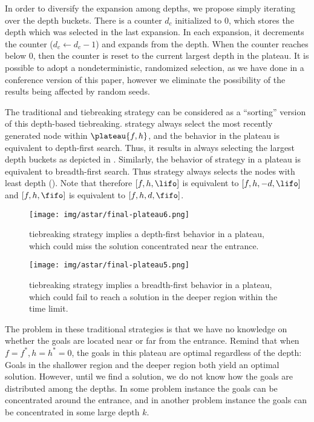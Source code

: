 In order to diversify the expansion among depths, we propose simply
iterating over the depth buckets. There is a counter $d_c$ initialized
to 0, which stores the depth which was selected in the last expansion.
In each expansion, it decrements the counter ($d_c\leftarrow d_c-1$) and
expands from the depth. When the counter reaches below 0, then the
counter is reset to the current largest depth in the plateau.
It is possible to adopt a
nondeterministic, randomized selection, as we have done in a conference
version of this paper, however we eliminate the possibility of the
results being affected by random seeds.

The traditional \lifo and \fifo tiebreaking strategy can be
considered as a ``sorting'' version of this depth-based tiebreaking.
\lifo strategy always select the most recently generated node
within $\plateau{f,h}$, and the behavior in the plateau is equivalent to depth-first search.
Thus, it results in always selecting the largest depth
buckets as depicted in .
Similarly, the behavior of \fifo strategy 
in a plateau is equivalent to breadth-first search. Thus \fifo strategy
always selects the nodes with least depth ().
Note that therefore $[f,h,\lifo]$ is equivalent to $[f,h,-d,\lifo]$ and
$[f,h,\fifo]$ is equivalent to $[f,h,d,\fifo]$.

\begin{figure}[htbp]
 \texttt{[image: img/astar/final-plateau6.png]}
 \caption{\lifo tiebreaking strategy implies a depth-first behavior in a
 plateau, which could miss the solution concentrated near the entrance.}
 \label{fig:plateau-depiction-lifo}
\end{figure}

\begin{figure}[htbp]
 \texttt{[image: img/astar/final-plateau5.png]}
 \caption{\fifo tiebreaking strategy implies a breadth-first behavior in a
 plateau, which could fail to reach a solution in the deeper region
 within the time limit.}
 \label{fig:plateau-depiction-fifo}
\end{figure}


The problem in these traditional strategies is that we have no knowledge
on whether the goals are located near or far from the entrance. Remind
that when $f=f^*, h=h^*=0$, the goals in this plateau are optimal
regardless of the depth: Goals in the shallower region and the deeper
region both yield an optimal solution. However, until we find a
solution, we do not know how the goals are distributed among the
depths. In some problem instance the goals can be concentrated around
the entrance, and in another problem instance the goals can be
concentrated in some large depth $k$.

